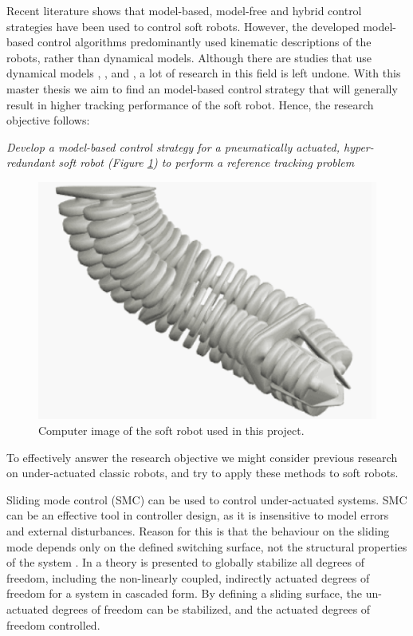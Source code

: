 Recent literature shows that model-based, model-free and hybrid control strategies have been used to control soft robots. However, the developed model-based control algorithms predominantly used kinematic descriptions of the robots, rather than dynamical models. Although there are studies that use dynamical models  \cite{falkenhahn2016dynamic}, \cite{della2020model}, and \cite{kapadia2011task}, a lot of research in this field is left undone. With this master thesis we aim to find an model-based control strategy that will generally result in higher tracking performance of the soft robot. Hence, the research objective follows:



\textit{Develop a model-based control strategy for a pneumatically actuated, hyper-redundant soft robot (Figure \ref{fig:sorotoki}) to perform a reference tracking problem}




\begin{figure}[H]
    \centering
    \includegraphics{Figures/sorotoki1.png}
    \caption{Computer image of the soft robot used in this project.}
    \label{fig:sorotoki}
\end{figure}


To effectively answer the research objective we might consider previous research on under-actuated classic robots, and try to apply these methods to soft robots.

Sliding mode control (SMC) can be used to control under-actuated systems. SMC can be an effective tool in controller design, as it is insensitive to model errors and external disturbances. Reason for this is that the behaviour on the sliding mode depends only on the defined switching surface, not the structural properties of the system \cite{liu2013survey}. In \cite{xu2008sliding} a theory is presented to globally stabilize all degrees of freedom, including the non-linearly coupled, indirectly actuated degrees of freedom for a system in cascaded form. By defining a sliding surface, the un-actuated degrees of freedom can be stabilized, and the actuated degrees of freedom controlled.

